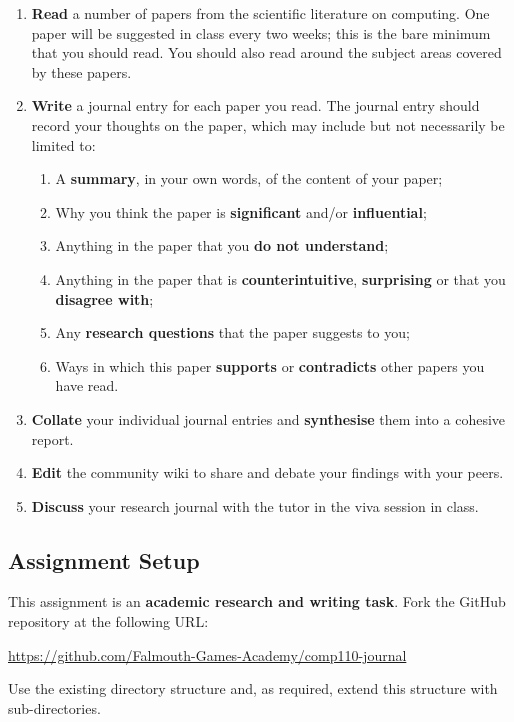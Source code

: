 \documentclass{../fal_assignment}
\begin{document}
\begin{enumerate}[label=\Alph*.]
    \item \textbf{Read} a number of papers from the scientific literature on computing.
    	One paper will be suggested in class every two weeks; this is the bare minimum that you should read.
    	You should also read around the subject areas covered by these papers.
    \item \textbf{Write} a journal entry for each paper you read. The journal entry should record your thoughts on the paper,
    	which may include but not necessarily be limited to:
    	\begin{enumerate}[label=\roman*.]
    		\item A \textbf{summary}, in your own words, of the content of your paper;
    		\item Why you think the paper is \textbf{significant} and/or \textbf{influential};
    		\item Anything in the paper that you \textbf{do not understand};
    		\item Anything in the paper that is \textbf{counterintuitive}, \textbf{surprising} or that you \textbf{disagree with};
    		\item Any \textbf{research questions} that the paper suggests to you;
    		\item Ways in which this paper \textbf{supports} or \textbf{contradicts} other papers you have read.
    	\end{enumerate}
    \item \textbf{Collate} your individual journal entries and \textbf{synthesise} them into a cohesive report.
    \item \textbf{Edit} the community wiki to share and debate your findings with your peers.
    \item \textbf{Discuss} your research journal with the tutor in the viva session in class.
\end{enumerate}

\subsection*{Assignment Setup}

This assignment is an \textbf{academic research and writing task}. Fork the GitHub repository at the following URL:

\indent \url{https://github.com/Falmouth-Games-Academy/comp110-journal}

Use the existing directory structure and, as required, extend this structure with sub-directories.
\end{document}
